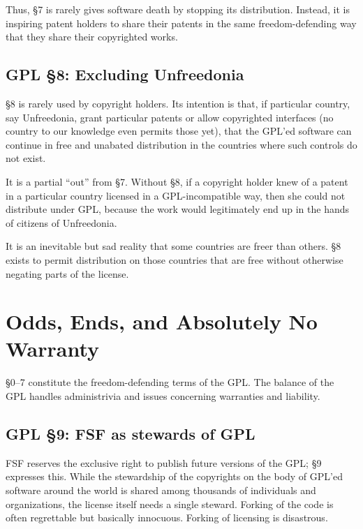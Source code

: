 \documentclass[12pt]{report}
\begin{document}
Thus, \S 7 is rarely gives software death by stopping its distribution.
Instead, it is inspiring patent holders to share their patents in the same
freedom-defending way that they share their copyrighted works.

\section{GPL \S 8: Excluding Unfreedonia}
\label{GPLs8}

\S 8 is rarely used by copyright holders.  Its intention is that, if
particular country, say Unfreedonia, grant particular patents or allow
copyrighted interfaces (no country to our knowledge even permits those
yet), that the GPL'ed software can continue in free and unabated
distribution in the countries where such controls do not exist.

It is a partial ``out'' from \S 7.  Without \S 8, if a copyright holder
knew of a patent in a particular country licensed in a GPL-incompatible
way, then she could not distribute under GPL, because the work would
legitimately end up in the hands of citizens of Unfreedonia.

It is an inevitable but sad reality that some countries are freer than
others.  \S 8 exists to permit distribution on those countries that are
free without otherwise negating parts of the license.

\chapter{Odds, Ends, and Absolutely No Warranty}

\S 0--7 constitute the freedom-defending terms of the GPL.  The balance
of the GPL handles administrivia and issues concerning warranties and
liability.

\section{GPL \S 9: FSF as stewards of GPL}
\label{GPLs9}

FSF reserves the exclusive right to publish future versions of the GPL\@;
\S 9 expresses this.  While the stewardship of the copyrights on the body
of GPL'ed software around the world is shared among thousands of
individuals and organizations, the license itself needs a single steward.
Forking of the code is often regrettable but basically innocuous.  Forking
of licensing is disastrous.
\end{document}
